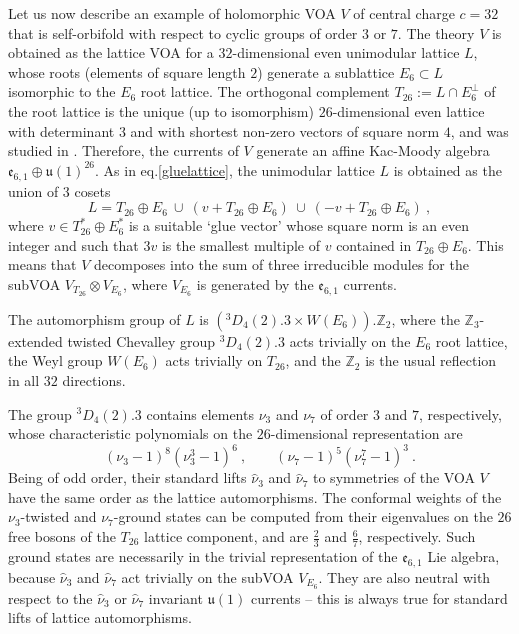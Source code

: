 \documentclass[11pt,reqno]{article}
\newcommand{\be}{\begin{equation}}
\newcommand{\ee}{\end{equation}}
\newcommand{\ZZ}{\mathbb{Z}}
\newcommand{\alg}[1]{\mathfrak{#1}}
\begin{document}
Let us now describe an example of  holomorphic VOA $V$ of central charge $c=32$ that is self-orbifold with respect to cyclic groups of order $3$ or $7$. The theory $V$ is obtained as the lattice VOA for a $32$-dimensional even unimodular lattice $L$, whose roots (elements of square length $2$) generate a sublattice $E_6\subset L$ isomorphic to the $E_6$ root lattice.  The orthogonal complement $T_{26}:=L\cap E_6^\perp$ of the root lattice  is the unique (up to isomorphism) $26$-dimensional even lattice with determinant $3$ and with shortest non-zero vectors of square norm $4$, and was studied in \cite{Borcherds1984Leech}. Therefore, the currents of $V$ generate an affine Kac-Moody algebra $\mathfrak{e}_{6,1}\oplus \alg{u}(1)^{26}$. As in eq.\eqref{gluelattice}, the unimodular lattice $L$ is obtained as the union of $3$ cosets
\be L=T_{26}\oplus E_6\ \cup\ (v+T_{26}\oplus E_6)\ \cup\ (-v+T_{26}\oplus E_6)\ ,
\ee where $v\in T_{26}^*\oplus E_6^*$ is a suitable `glue vector' whose square norm is an even integer and such that $3v$ is the smallest multiple of $v$ contained in $T_{26}\oplus E_6$. This means that $V$ decomposes into the sum of three irreducible modules for the subVOA $V_{T_{26}}\otimes V_{E_6}$, where $V_{E_6}$ is generated by the $\alg{e}_{6,1}$ currents.

The automorphism group of $L$ is $( {}^3D_4(2).3\times W(E_6)).\ZZ_2$, where the $\ZZ_3$-extended twisted Chevalley group ${}^3D_4(2).3$ acts trivially on the $E_6$ root lattice, the Weyl group $W(E_6)$ acts trivially on $T_{26}$, and the $\ZZ_2$ is the usual reflection in all $32$ directions.

The group ${}^3D_4(2).3$ contains elements $\nu_3$ and $\nu_7$ of order $3$ and $7$, respectively, whose characteristic polynomials on the $26$-dimensional representation are
\be (\nu_3-1)^8(\nu_3^3-1)^6\ ,\qquad (\nu_7-1)^5(\nu_7^7-1)^3\ .
\ee Being of odd order, their standard lifts $\hat\nu_3$ and $\hat\nu_7$ to symmetries of the VOA $V$ have the same order as the lattice automorphisms. The conformal weights of the $\nu_3$-twisted and $\nu_7$-ground states can be computed from their eigenvalues on the $26$ free bosons of the $T_{26}$ lattice component, and are $\frac{2}{3}$ and $\frac{6}{7}$, respectively. Such ground states are necessarily in the trivial representation of the $\alg{e}_{6,1}$ Lie algebra, because $\hat\nu_3$ and $\hat\nu_7$ act trivially on the subVOA $V_{E_6}$. They are also neutral with respect to the $\hat\nu_3$ or $\hat\nu_7$ invariant $\alg{u}(1)$ currents -- this is always true for standard lifts of lattice automorphisms.
\end{document}

